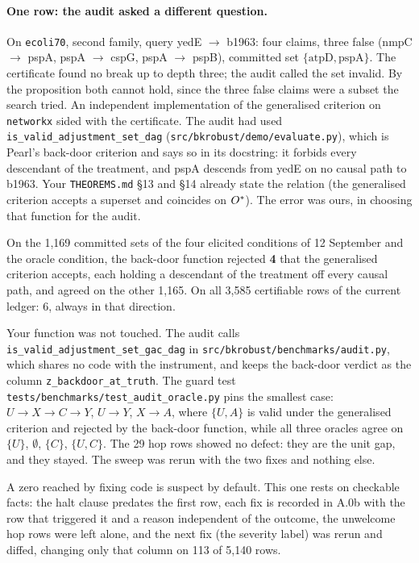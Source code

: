 \paragraph{One row: the audit asked a different question.} On \texttt{ecoli70}, second family, query
yedE $\to$ b1963: four claims, three false (nmpC $\to$ pspA, pspA $\to$ cspG, pspA $\to$ pspB),
committed
set $\{\text{atpD}, \text{pspA}\}$. The certificate found no break up to depth three; the audit called
the set invalid. By the proposition both cannot hold, since the three false claims were a subset the
search tried. An independent implementation of the generalised criterion on \texttt{networkx} sided with
the certificate. The audit had used \texttt{is\_valid\_adjustment\_set\_dag}
(\texttt{src/bkrobust/demo/evaluate.py}), which is Pearl's back-door criterion and says so in its
docstring: it forbids every descendant of the treatment, and pspA descends from yedE on no causal path
to
b1963. Your \texttt{THEOREMS.md} §13 and §14 already state the relation (the generalised criterion
accepts a superset and coincides on $O^{*}$). The error was ours, in choosing that function for the
audit.

\begin{medido}
On the 1,169 committed sets of the four elicited conditions of 12 September and the oracle condition,
the back-door function rejected \textbf{4} that the generalised criterion accepts, each holding a
descendant of the treatment off every causal path, and agreed on the other 1,165. On all 3,585
certifiable rows of the current ledger: 6, always in that direction.
\end{medido}

Your function was not touched. The audit calls \texttt{is\_valid\_adjustment\_set\_gac\_dag} in
\texttt{src/bkrobust/benchmarks/audit.py}, which shares no code with the instrument, and keeps the
back-door verdict as the column \texttt{z\_backdoor\_at\_truth}. The guard test
\texttt{tests/\allowbreak benchmarks/\allowbreak test\_audit\_oracle.py} pins the smallest case: $U
\to X \to C \to Y$, $U \to Y$,
$X \to A$, where $\{U, A\}$ is valid under the generalised criterion and rejected by the back-door
function, while all three oracles agree on $\{U\}$, $\emptyset$, $\{C\}$, $\{U, C\}$. The 29 hop rows
showed no defect: they are the unit gap, and they stayed. The sweep was rerun with the two fixes and
nothing else.

A zero reached by fixing code is suspect by default. This one rests on checkable facts: the halt clause
predates the first row, each fix is recorded in A.0b with the row that triggered it and a reason
independent of the outcome, the unwelcome hop rows were left alone, and the next fix (the severity
label)
was rerun and diffed, changing only that column on 113 of 5,140 rows.

